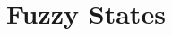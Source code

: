 \documentclass[english,reprint, aps, prl,superscriptaddress, showpacs,
showkeys, longbibliography, amsmath, amssymb]{revtex4-1}
\theoremstyle{plain}
\theoremstyle{definition}
\newcommand{\events}{\ensuremath{\mathcal{E}}}
\newcommand{\imposs}{{\text{\wesa{impossible}}}}
\newcommand{\necess}{{\text{\wesa{certain}}}}
\begin{document}

\section{Fuzzy States}
\end{document}
